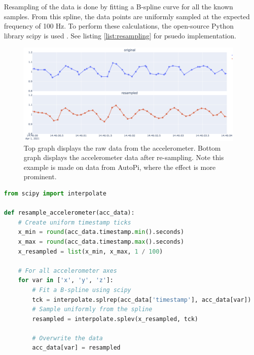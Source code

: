 Resampling of the data is done by fitting a B-spline curve for all the known samples. From this spline, the data points are uniformly sampled at the expected frequency of 100 Hz. To perform these calculations, the open-source Python library scipy is used \cite{scipy}. See listing \ref{list:resampling} for psuedo implementation.


\begin{figure}[H]
\begin{center}
\includegraphics[width=.95\textwidth,keepaspectratio]{images/4_data/accelerometer-resampling.png}
\end{center}
\captionsetup{width=.90\textwidth}
\caption{Top graph displays the raw data from the accelerometer. Bottom graph displays the accelerometer data after re-sampling. Note this example is made on data from AutoPi, where the effect is more prominent.}
\label{fig:accelerometer-resampling}
\end{figure}


\begin{lstlisting}[language=Python, caption={Psuedo implementation of resampling accelerometer data.}, label={list:resampling}]
from scipy import interpolate

def resample_accelerometer(acc_data):
    # Create uniform timestamp ticks
    x_min = round(acc_data.timestamp.min().seconds)
    x_max = round(acc_data.timestamp.max().seconds)
    x_resampled = list(x_min, x_max, 1 / 100)

    # For all accelerometer axes
    for var in ['x', 'y', 'z']:
        # Fit a B-spline using scipy
        tck = interpolate.splrep(acc_data['timestamp'], acc_data[var])
        # Sample uniformly from the spline
        resampled = interpolate.splev(x_resampled, tck)
        
        # Overwrite the data
        acc_data[var] = resampled
\end{lstlisting}



